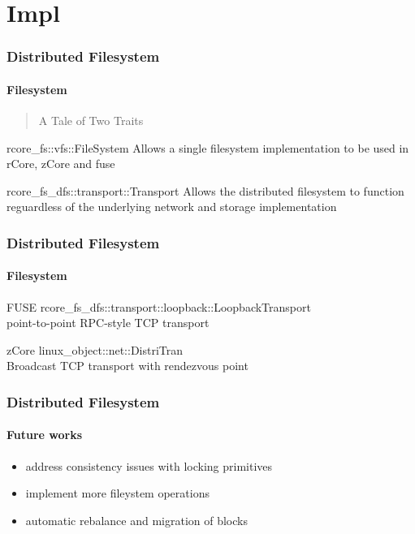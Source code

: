 \documentclass{ctexbeamer}
\begin{document}
\section{Impl}
\begin{frame}
\frametitle{Distributed Filesystem}
\framesubtitle{Filesystem}
\begin{verse}
  A Tale of Two Traits
\end{verse}
\begin{block}{rcore\_fs::vfs::FileSystem}
  Allows a single filesystem implementation to be used in rCore, zCore and fuse
\end{block}
\begin{block}{rcore\_fs\_dfs::transport::Transport}
  Allows the distributed filesystem to function reguardless of the underlying network and storage implementation
\end{block}
\end{frame}

\begin{frame}
\frametitle{Distributed Filesystem}
\framesubtitle{Filesystem}
\begin{block}{FUSE}
  rcore\_fs\_dfs::transport::loopback::LoopbackTransport \\
  point-to-point RPC-style TCP transport \\
\end{block}
\begin{block}{zCore}
  linux\_object::net::DistriTran \\
  Broadcast TCP transport with rendezvous point \\
\end{block}
\end{frame}

\begin{frame}
\frametitle{Distributed Filesystem}
\framesubtitle{Future works}
  \begin{itemize}
    \item address consistency issues with locking primitives
    \item implement more fileystem operations
    \item automatic rebalance and migration of blocks
  \end{itemize}
\end{frame}

\section{}
\frame{\titlepage}
\end{document}
